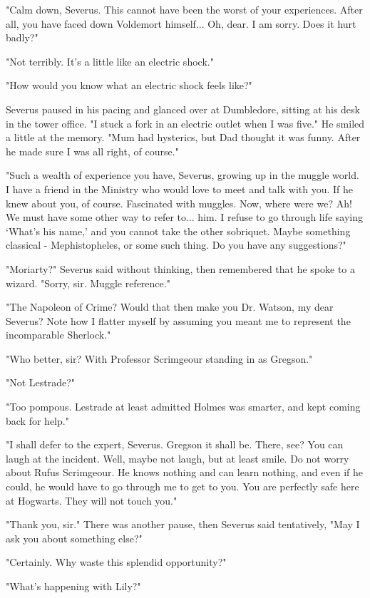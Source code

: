 "Calm down, Severus. This cannot have been the worst of your experiences. After all, you have faced down Voldemort himself... Oh, dear. I am sorry. Does it hurt badly?"

"Not terribly. It's a little like an electric shock."

"How would you know what an electric shock feels like?"

Severus paused in his pacing and glanced over at Dumbledore, sitting at his desk in the tower office. "I stuck a fork in an electric outlet when I was five." He smiled a little at the memory. "Mum had hysterics, but Dad thought it was funny. After he made sure I was all right, of course."

"Such a wealth of experience you have, Severus, growing up in the muggle world. I have a friend in the Ministry who would love to meet and talk with you. If he knew about you, of course. Fascinated with muggles. Now, where were we? Ah! We must have some other way to refer to... him. I refuse to go through life saying `What's his name,' and you cannot take the other sobriquet. Maybe something classical - Mephistopheles, or some such thing. Do you have any suggestions?"

"Moriarty?" Severus said without thinking, then remembered that he spoke to a wizard. "Sorry, sir. Muggle reference."

"The Napoleon of Crime? Would that then make you Dr. Watson, my dear Severus? Note how I flatter myself by assuming you meant me to represent the incomparable Sherlock."

"Who better, sir? With Professor Scrimgeour standing in as Gregson."

"Not Lestrade?"

"Too pompous. Lestrade at least admitted Holmes was smarter, and kept coming back for help."

"I shall defer to the expert, Severus. Gregson it shall be. There, see? You can laugh at the incident. Well, maybe not laugh, but at least smile. Do not worry about Rufus Scrimgeour. He knows nothing and can learn nothing, and even if he could, he would have to go through me to get to you. You are perfectly safe here at Hogwarts. They will not touch you."

"Thank you, sir." There was another pause, then Severus said tentatively, "May I ask you about something else?"

"Certainly. Why waste this splendid opportunity?"

"What's happening with Lily?"

